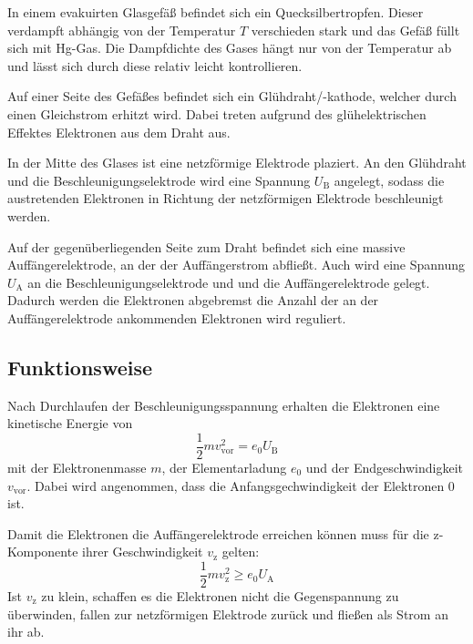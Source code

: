 \documentclass[titlepage = firstcover]{scrartcl}
\begin{document}
            In einem evakuirten Glasgefäß befindet sich ein Quecksilbertropfen.
            Dieser verdampft abhängig von der Temperatur $T$ verschieden stark und das Gefäß füllt sich mit Hg-Gas.
            Die Dampfdichte des Gases hängt nur von der Temperatur ab und lässt sich durch diese relativ leicht kontrollieren.

            Auf einer Seite des Gefäßes befindet sich ein Glühdraht/-kathode, welcher durch einen Gleichstrom erhitzt wird.
            Dabei treten aufgrund des glühelektrischen Effektes Elektronen aus dem Draht aus.

            In der Mitte des Glases ist eine netzförmige Elektrode plaziert.
            An den Glühdraht und die Beschleunigungselektrode wird eine Spannung $U_{\text{B}}$ angelegt, sodass die austretenden Elektronen in Richtung der netzförmigen Elektrode beschleunigt werden.

            Auf der gegenüberliegenden Seite zum Draht befindet sich eine massive Auffängerelektrode, an der der Auffängerstrom abfließt.
            Auch wird eine Spannung $U_{\text{A}}$ an die Beschleunigungselektrode und und die Auffängerelektrode gelegt.
            Dadurch werden die Elektronen abgebremst die Anzahl der an der Auffängerelektrode ankommenden Elektronen wird reguliert.

        \subsection{Funktionsweise}
            Nach Durchlaufen der Beschleunigungsspannung erhalten die Elektronen eine kinetische Energie von
            \begin{equation*}
                \frac{1}{2} m v^2_{\text{vor}} = e_0 U_{\text{B}}
            \end{equation*}
            mit der Elektronenmasse $m$, der Elementarladung $e_0$ und der Endgeschwindigkeit $v_{\text{vor}}$.
            Dabei wird angenommen, dass die Anfangsgechwindigkeit der Elektronen 0 ist.

            Damit die Elektronen die Auffängerelektrode erreichen können muss für die z-Komponente ihrer Geschwindigkeit $v_{\text{z}}$ gelten:
            \begin{equation*}
                \frac{1}{2} m v^2_{\text{z}} \geq e_0 U_{\text{A}}
            \end{equation*}
            Ist $v_{\text{z}}$ zu klein, schaffen es die Elektronen nicht die Gegenspannung zu überwinden, fallen zur netzförmigen Elektrode zurück und fließen als Strom an ihr ab. \\
\end{document}
